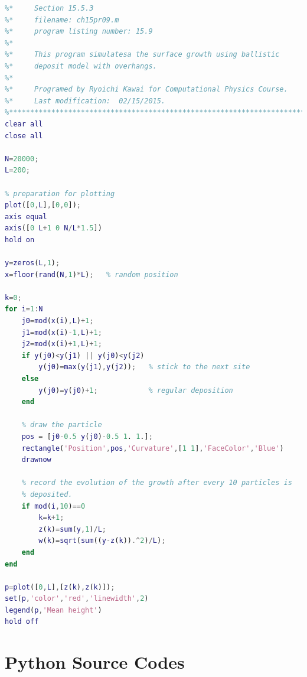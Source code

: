 \bigskip
\noindent
\program
\label{prog:bd3}
\footnotesize
\begin{lstlisting}[language=matlab]
%**************************************************************************
%*     Section 15.5.3                                                     *
%*     filename: ch15pr09.m                                               *
%*     program listing number: 15.9                                       *
%*                                                                        *
%*     This program simulatesa the surface growth using ballistic         *
%*     deposit model with overhangs.                                      *
%*                                                                        *
%*     Programed by Ryoichi Kawai for Computational Physics Course.       *
%*     Last modification:  02/15/2015.                                    *
%**************************************************************************
clear all
close all

N=20000;
L=200;

% preparation for plotting
plot([0,L],[0,0]);
axis equal
axis([0 L+1 0 N/L*1.5])
hold on

y=zeros(L,1);
x=floor(rand(N,1)*L);   % random position

k=0;
for i=1:N
    j0=mod(x(i),L)+1;
    j1=mod(x(i)-1,L)+1;
    j2=mod(x(i)+1,L)+1;
    if y(j0)<y(j1) || y(j0)<y(j2)
        y(j0)=max(y(j1),y(j2));   % stick to the next site
    else
        y(j0)=y(j0)+1;            % regular deposition
    end
    
    % draw the particle
    pos = [j0-0.5 y(j0)-0.5 1. 1.];
    rectangle('Position',pos,'Curvature',[1 1],'FaceColor','Blue')
    drawnow
    
    % record the evolution of the growth after every 10 particles is
    % deposited.
    if mod(i,10)==0
        k=k+1;
        z(k)=sum(y,1)/L;
        w(k)=sqrt(sum((y-z(k)).^2)/L);
    end
end

p=plot([0,L],[z(k),z(k)]);
set(p,'color','red','linewidth',2)
legend(p,'Mean height')
hold off
\end{lstlisting}
\normalsize

\bigskip
\noindent
\section*{Python Source Codes}
\setcounter{program}{0}

